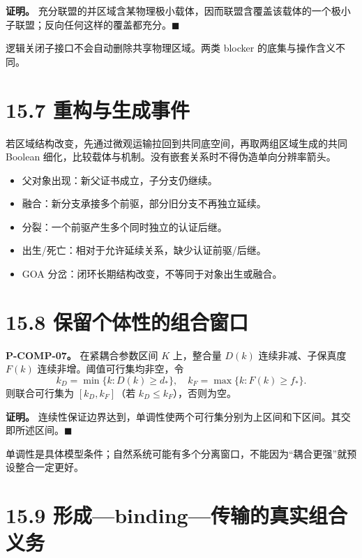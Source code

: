 \documentclass[
  11pt,
  oneside]{book}
\providecommand{\tightlist}{%
  \setlength{\itemsep}{0pt}\setlength{\parskip}{0pt}}
\begin{document}
\textbf{证明。} 充分联盟的并区域含某物理极小载体，因而联盟含覆盖该载体的一个极小子联盟；反向任何这样的覆盖都充分。\(\blacksquare\)

逻辑关闭子接口不会自动删除共享物理区域。两类 blocker 的底集与操作含义不同。

\section{15.7 重构与生成事件}\label{ux91cdux6784ux4e0eux751fux6210ux4e8bux4ef6}

若区域结构改变，先通过微观运输拉回到共同底空间，再取两组区域生成的共同 Boolean 细化，比较载体与机制。没有嵌套关系时不得伪造单向分辨率箭头。

\begin{itemize}
\tightlist
\item
  父对象出现：新父证书成立，子分支仍继续。
\item
  融合：新分支承接多个前驱，部分旧分支不再独立延续。
\item
  分裂：一个前驱产生多个同时独立的认证后继。
\item
  出生/死亡：相对于允许延续关系，缺少认证前驱/后继。
\item
  GOA 分岔：闭环长期结构改变，不等同于对象出生或融合。
\end{itemize}

\section{15.8 保留个体性的组合窗口}\label{ux4fddux7559ux4e2aux4f53ux6027ux7684ux7ec4ux5408ux7a97ux53e3}

\hypertarget{p-comp-07}{}\label{p-comp-07}

\textbf{P-COMP-07。} 在紧耦合参数区间 \(K\) 上，整合量 \(D(k)\) 连续非减、子保真度 \(F(k)\) 连续非增。阈值可行集均非空，令 \[k_D=\min\{k:D(k)\ge d_*\},\quad
k_F=\max\{k:F(k)\ge f_*\}.\] 则联合可行集为 \([k_D,k_F]\)（若 \(k_D\le k_F\)），否则为空。

\textbf{证明。} 连续性保证边界达到，单调性使两个可行集分别为上区间和下区间。其交即所述区间。\(\blacksquare\)

单调性是具体模型条件；自然系统可能有多个分离窗口，不能因为``耦合更强''就预设整合一定更好。

\section{15.9 形成---binding---传输的真实组合义务}\label{ux5f62ux6210bindingux4f20ux8f93ux7684ux771fux5b9eux7ec4ux5408ux4e49ux52a1}
\end{document}
